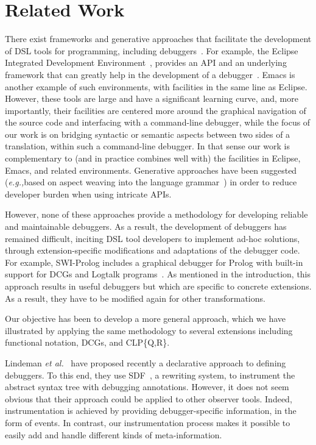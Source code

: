 \documentclass[preprint]{llncs}
\newcommand{\eg}{\emph{e.g.,\xspace}}
\begin{document}
{\section{Related Work}
\label{sec:relatedwork}


There exist frameworks and generative approaches that facilitate the
development of DSL tools for programming, including
debuggers~\cite{eclipse,tide}. For example, the Eclipse Integrated
Development Environment~\cite{eclipse}, provides an API and an
underlying framework that can greatly help in the development of a
debugger~\cite{eclipsehowtodebug}.  Emacs 
is another example of such environments, with facilities in the same
line as
Eclipse.  However, 
these tools are large and have a significant learning curve, and, more
importantly, their facilities are centered more around the graphical
navigation of the source code and interfacing with a command-line
debugger, while the focus of our work is on bridging syntactic or
semantic aspects between two sides of a translation, within such a
command-line debugger.
In that sense our work is complementary to (and in practice combines
well with) the facilities in Eclipse, Emacs, and related environments.
Generative approaches have been suggested (\eg based on aspect weaving
into the language grammar~\cite{debugaspect05}) in order to reduce
developer burden when using intricate APIs.  

However, none of these approaches provide a methodology for developing
reliable and maintainable debuggers. As a result, the development of
debuggers has remained difficult, inciting DSL tool developers to
implement ad-hoc solutions,
through extension-specific modifications and adaptations of the
debugger code. For example, SWI-Prolog includes a graphical debugger for Prolog with built-in support for DCGs and Logtalk
programs~\cite{swipl-debug}. As mentioned in the introduction, this
approach results in useful debuggers but which are specific to
concrete extensions. As a result, they have to be modified again for
other transformations.

Our objective has been to develop a more general approach, which we
have illustrated by applying the same 
methodology to several extensions including functional notation, DCGs, 
and CLP\{Q,R\}. 



Lindeman \emph{et al.}~\cite{lindeman11} have proposed recently a
declarative approach to defining debuggers. To this end, they use
SDF~\cite{sdfasf}, a rewriting system, to instrument the abstract
syntax tree with debugging annotations. However, it does not seem
obvious that their approach could be applied to other observer
tools. Indeed, instrumentation is achieved by providing
debugger-specific information, in the form of events. In contrast, our
instrumentation process makes it possible to easily add and handle
different kinds of meta-information.

}
\end{document}
